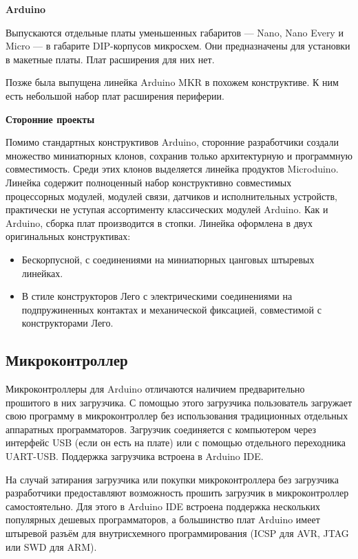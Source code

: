 \documentclass[12pt, oneside]{altsu-report}
\begin{document}
\begin{center}
    \textbf{Arduino}
\end{center}

Выпускаются отдельные платы уменьшенных габаритов — Nano, Nano Every и Micro — в габарите DIP-корпусов микросхем. Они предназначены для установки в макетные платы. Плат расширения для них нет.

Позже была выпущена линейка Arduino MKR в похожем конструктиве. К ним есть небольшой набор плат расширения периферии.

\begin{center}
    \textbf{Сторонние проекты}
\end{center}

Помимо стандартных конструктивов Arduino, сторонние разработчики создали множество миниатюрных клонов, сохранив только архитектурную и программную совместимость. Среди этих клонов выделяется линейка продуктов Microduino. Линейка содержит полноценный набор конструктивно совместимых процессорных модулей, модулей связи, датчиков и исполнительных устройств, практически не уступая ассортименту классических модулей Arduino. Как и Arduino, сборка плат производится в стопки. Линейка оформлена в двух оригинальных конструктивах:

\begin{itemize}
    \item Бескорпусной, с соединениями на миниатюрных цанговых штыревых линейках.

    \item В стиле конструкторов Лего с электрическими соединениями на подпружиненных контактах и механической фиксацией, совместимой с конструкторами Лего.
\end{itemize}

\subsection{Микроконтроллер}

Микроконтроллеры для Arduino отличаются наличием предварительно прошитого в них загрузчика. С помощью этого загрузчика пользователь загружает свою программу в микроконтроллер без использования традиционных отдельных аппаратных программаторов. Загрузчик соединяется с компьютером через интерфейс USB (если он есть на плате) или с помощью отдельного переходника UART-USB. Поддержка загрузчика встроена в Arduino IDE.

На случай затирания загрузчика или покупки микроконтроллера без загрузчика разработчики предоставляют возможность прошить загрузчик в микроконтроллер самостоятельно. Для этого в Arduino IDE встроена поддержка нескольких популярных дешевых программаторов, а большинство плат Arduino имеет штыревой разъём для внутрисхемного программирования (ICSP для AVR, JTAG или SWD для ARM).
\end{document}
